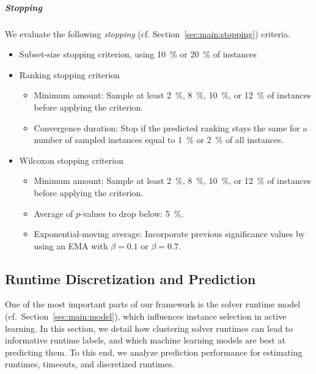 \documentclass[sn-basic, Numbered]{sn-jnl} %
\begin{document}
\subparagraph{Stopping}

We evaluate the following \emph{stopping} (cf. Section~\ref{sec:main:stopping}) criteria.

\begin{itemize}\setlength{\itemsep}{1pt}
  \item Subset-size stopping criterion, using \SI{10}{\%} or \SI{20}{\%} of instances
  \item Ranking stopping criterion
  \vspace*{-1ex}
  \begin{itemize}\setlength{\itemsep}{1pt}
    \item Minimum amount: Sample at least \SI{2}{\%}, \SI{8}{\%}, \SI{10}{\%}, or \SI{12}{\%} of instances before applying the criterion.
    \item Convergence duration: Stop if the predicted ranking stays the same for a number of sampled instances equal to \SI{1}{\%} or \SI{2}{\%} of all instances.
  \end{itemize}
  \item Wilcoxon stopping criterion
  \vspace*{-1ex}
  \begin{itemize}\setlength{\itemsep}{1pt}
    \item Minimum amount: Sample at least \SI{2}{\%}, \SI{8}{\%}, \SI{10}{\%}, or \SI{12}{\%} of instances before applying the criterion.
    \item Average of $p$-values to drop below: \SI{5}{\%}.
    \item Exponential-moving average: Incorporate previous significance values by using an EMA with $\beta = 0.1$ or $\beta = 0.7$.
  \end{itemize}
\end{itemize}

\subsection{Runtime Discretization and Prediction}
\label{sec:exdesign:disc-pred}

One of the most important parts of our framework is the solver runtime model (cf.~Section~\ref{sec:main:model}), which influences instance selection in active learning.
In this section, we detail how clustering solver runtimes can lead to informative runtime labels, and which machine learning models are best at predicting them.
To this end, we analyze prediction performance for estimating runtimes, timeouts, and discretized runtimes.
\end{document}
